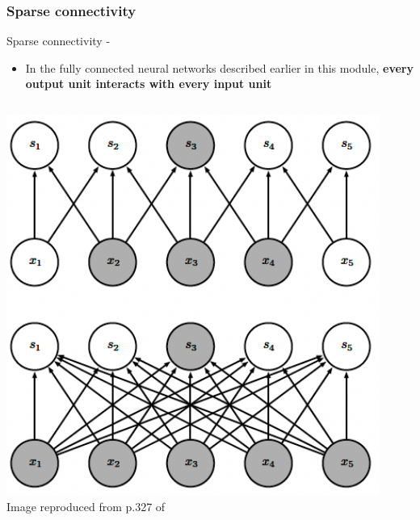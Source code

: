 \subsubsection{Sparse connectivity}
\begin{frame}[t,allowframebreaks]{Sparse connectivity -}

    \begin{itemize}
        \item 
        In the fully connected neural networks described earlier in this module, 
        {\bf every output unit interacts with every input unit} 
    \end{itemize}

    \framebreak

    \begin{columns}
        \begin{column}{0.50\textwidth}
         \begin{center}
          \includegraphics[width=1.0\textwidth]
          {./images/cnn/sparse_connectivity/goodfellow17_sparse_connectivity_from_above_01.png}\\
          {\scriptsize \color{col:attribution} 
          Image reproduced from p.327 of \cite{Goodfellow:2017MITDL}}\\
         \end{center}
        \end{column}
        \begin{column}{0.50\textwidth}
        \end{column}
    \end{columns}


\end{frame}
